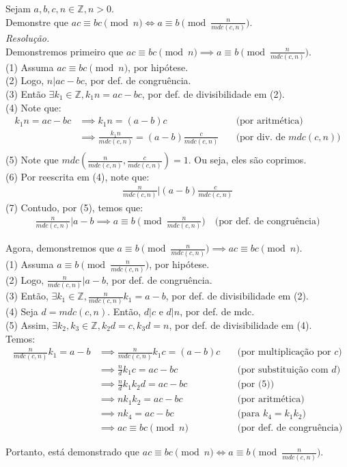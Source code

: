 Sejam $a, b, c, n \in \mathbb{Z}, n > 0$. \\
Demonstre que $ac \equiv bc \pmod{n} \iff a \equiv b \pmod{\frac{n}{mdc(c, n)}}$. \\
\emph{Resolução.} \\
Demonstremos primeiro que $ac \equiv bc \pmod{n} \implies a \equiv b \pmod{\frac{n}{mdc(c, n)}}$. \\
(1) Assuma $ac \equiv bc \pmod{n}$, por hipótese. \\
(2) Logo, $n | ac - bc$, por def. de congruência. \\
(3) Então $\exists k_1 \in \mathbb{Z}, k_1n = ac - bc$, por def. de divisibilidade em (2). \\
(4) Note que:
\begin{align*}
	k_1n = ac - bc &\implies k_1n = (a - b)c &\quad \text{(por aritmética)} \\
	&\implies \frac{k_1n}{mdc(c, n)} = (a-b)\frac{c}{mdc(c, n)} &\quad \text{(por div. de $mdc(c, n)$)} \\
\end{align*}
(5) Note que $mdc(\frac{n}{mdc(c, n)}, \frac{c}{mdc(c, n)}) = 1$. Ou seja, eles são coprimos. \\
(6) Por reescrita em (4), note que:
\begin{align*}
	\frac{n}{mdc(c, n)} | (a-b)\frac{c}{mdc(c,n)}
\end{align*}
(7) Contudo, por (5), temos que:
\begin{align*}
	\frac{n}{mdc(c, n)} | a - b \implies a \equiv b \pmod{\frac{n}{mdc(c, n)}} \quad \text{(por def. de congruência)}
\end{align*}

Agora, demonstremos que $a \equiv b \pmod{\frac{n}{mdc(c, n)}} \implies ac \equiv bc \pmod{n}$. \\
(1) Assuma $a \equiv b \pmod{\frac{n}{mdc(c, n)}}$, por hipótese. \\
(2) Logo, $\frac{n}{mdc(c, n)} | a - b$, por def. de congruência. \\
(3) Então, $\exists k_1 \in \mathbb{Z}, \frac{n}{mdc(c, n)} k_1 = a - b$, por def. de divisibilidade em (2). \\
(4) Seja $d = mdc(c, n)$. Então, $d|c$ e $d|n$, por def. de mdc. \\
(5) Assim, $\exists k_2, k_3 \in \mathbb{Z}, k_2d = c, k_3d = n$, por def. de divisibilidade em (4). \\
Temos:
\begin{align*}
	\frac{n}{mdc(c, n)} k_1 = a - b &\implies \frac{n}{mdc(c, n)} k_1c = (a - b)c &\quad \text{(por multiplicação por $c$)} \\ &\implies
	\frac{n}{d} k_1c = ac - bc &\quad \text{(por substituição com $d$)} \\ &\implies
	\frac{n}{d} k_1 k_2d = ac - bc &\quad \text{(por (5))} \\ &\implies
	n k_1 k_2 = ac - bc &\quad \text{(por aritmética)} \\ &\implies
	n k_4 = ac - bc &\quad \text{(para $k_4 = k_1k_2$)} \\ &\implies
	ac \equiv bc \pmod{n} &\quad \text{(por def. de congruência)} 
\end{align*}

Portanto, está demonstrado que $ac \equiv bc \pmod{n} \iff a \equiv b \pmod{\frac{n}{mdc(c, n)}}$. \\
